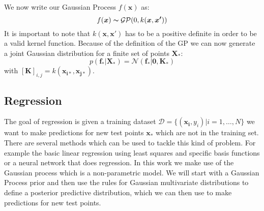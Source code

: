 \documentclass{article}
\begin{document}
We now write our Gaussian Process $f(\bm{x})$ as:
\begin{equation}
    f(\bm{x})\thicksim \mathcal{G} \mathcal{P}(0,k(\bm{x},\bm{x'})) 
\end{equation}
It is important to note that $ k(\bm{x},\bm{x'})$ has to be a positive definite in order to be a valid kernel function.
Because of the definition of the GP we can now generate a joint Gaussian distribution for a finite set of points $\bm{X_*}$:
\begin{equation}
    \label{eq:f_star_random_vector}
    p(\bm{f_*|\bm{X_*}}) = \mathcal{N}(\bm{f_*}|\bm{0},\bm{K_*})
\end{equation}
with ${[\bm{K}]}_{i,j} = k(\bm{x_{i*}},\bm{x_{j*}})$.

\subsection{Regression}
The goal of regression is given a training dataset $\mathcal{D} = \{(\bm{x_i},y_i)|i = 1,\ldots,N\}$ we want to make predictions for new test points $\bm{x_*}$ which are not in the training set. There are several methods which can be used to tackle this kind of problem. For example the basic linear regression using least squares and specific basis functions or a neural network that does regression. In this work we make use of the Gaussian process which is a non-parametric model. We will start with a Gaussian Process prior and then use the rules for Gaussian multivariate distributions to define a posterior predictive distribution, which we can then use to make predictions for new test points. 
\end{document}
